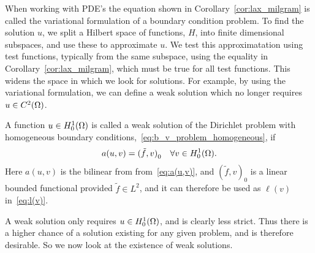 When working with PDE's the equation shown in Corollary~\ref{cor:lax_milgram} 
is called the variational formulation of a boundary condition problem. 
To find the solution $u$, we split a Hilbert space of functions, $H$, 
into finite dimensional subspaces, and use these to approximate $u$. 
We test this approximatation using test functions, typically from the same subspace,
 using the equality in Corollary~\ref{cor:lax_milgram}, which must be true for all test functions.
This widens the 
space in which we look for solutions.
For example, by using the variational formulation, we can define a weak solution 
which no longer requires $u \in C^2(\Omega)$.
\begin{defn}{\quad}
    A function $u\in H_0^1(\Omega)$ is called a weak solution of 
    the Dirichlet problem with homogeneous boundary conditions,~\eqref{eq:b_v_problem_homogeneous}, if 
     \begin{equation*}
        a(u,v) = {(\tilde{f},v)}_0 \quad \forall v \in H_0^1(\Omega).
     \end{equation*}
     Here $a(u,v)$ is the bilinear from from~\eqref{eq:a(u,v)}, 
     and ${(\tilde{f},v)}_0$ is a linear bounded functional provided $\tilde{f}\in L^2$, and it can therefore be used as $\ell(v)$ in~\eqref{eq:l(v)}.
\end{defn}
A weak solution only requires $u\in H_0^1(\Omega)$, and is clearly less strict. 
Thus there is a higher chance of a solution existing for any given problem, 
and is therefore desirable. So we now look at the existence of weak solutions.


